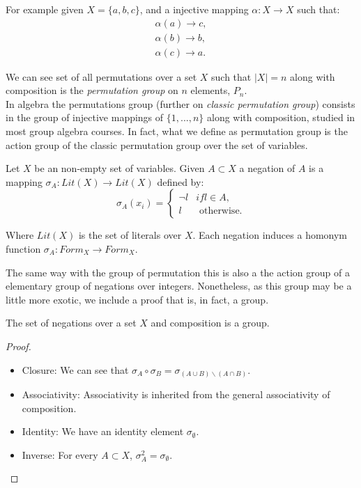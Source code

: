       For example given $X = \{a,b,c\}$, and a injective mapping $\alpha:X\to X$ such that: 
  \begin{equation}
     \begin{split}
       \alpha(a) \to c,\\
       \alpha(b) \to b,\\
       \alpha(c) \to a.
     \end{split}
 \end{equation}

 We can see set of all permutations over a set $X$ such that $|X|=n$ along with composition is the \emph{permutation group} on $n$ elements, $P_n$.\\

 In algebra the permutations group (further on \emph{classic permutation group}) consists in the group of injective mappings of $\{1,...,n\}$ along with composition, studied in most group algebra courses. In fact, what we define as permutation group is the action group of the classic permutation group over the set of variables. 

\begin{definition}
  Let $X$ be an non-empty set of variables. Given $A\subset X$ a negation of $A$ is a mapping $\sigma_{A}:Lit(X) \to Lit(X)$ defined by:
  $$
\sigma_{A}(x_{i})=
\begin{cases}
  \neg l & if l \in A, \\
  l & \text{ otherwise}.
\end{cases}$$

Where $Lit(X)$ is the set of literals over $X$. Each negation induces a homonym function $\sigma_{A}:Form_{X}\to Form_{X}$.
\end{definition}
The same way with the group of permutation this is also a the action group of a elementary group of negations over integers. Nonetheless, as this group may be a little more exotic, we include a proof that  is, in fact, a group.

\begin{proposition}
  The set of negations over a set $X$ and composition is a group.
\end{proposition}
\begin{proof}\hfill 
  \begin{itemize}
    \item Closure: We can see that $\sigma_{A}\circ\sigma_{B} = \sigma_{(A\cup B)\backslash (A\cap B)}$.
    \item Associativity: Associativity is inherited from the general associativity of composition.
    \item Identity: We have an identity element $\sigma_{\emptyset}$.
    \item Inverse: For every $A\subset X$, $\sigma_{A}^2 = \sigma_{\emptyset}$.
  \end{itemize}
\end{proof}

